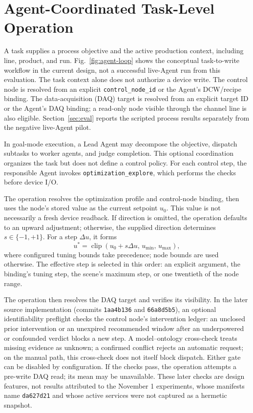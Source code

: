 \section{Agent-Coordinated Task-Level Operation}
\label{sec:closed-loop-operation}

A task supplies a process objective and the active production context, including line, product, and run. Fig.~\ref{fig:agent-loop} shows the conceptual task-to-write workflow in the current design, not a successful live-Agent run from this evaluation. The task context alone does not authorize a device write. The control node is resolved from an explicit \texttt{control\_node\_id} or the Agent's DCW/recipe binding. The data-acquisition (DAQ) target is resolved from an explicit target ID or the Agent's DAQ binding; a read-only node visible through the channel line is also eligible. Section~\ref{sec:eval} reports the scripted process results separately from the negative live-Agent pilot.

In goal-mode execution, a Lead Agent may decompose the objective, dispatch subtasks to worker agents, and judge completion. This optional coordination organizes the task but does not define a control policy. For each control step, the responsible Agent invokes \texttt{optimization\_explore}, which performs the checks before device I/O.

The operation resolves the optimization profile and control-node binding, then uses the node's stored value as the current setpoint $u_0$. This value is not necessarily a fresh device readback. If direction is omitted, the operation defaults to an upward adjustment; otherwise, the supplied direction determines $s\in\{-1,+1\}$. For a step $\Delta u$, it forms
\begin{equation}
 u^{*}=\operatorname{clip}\!\left(u_0+s\Delta u,\,u_{\min},\,u_{\max}\right),
 \label{eq:optimization-candidate}
\end{equation}
where configured tuning bounds take precedence; node bounds are used otherwise. The effective step is selected in this order: an explicit argument, the binding's tuning step, the scene's maximum step, or one twentieth of the node range.

The operation then resolves the DAQ target and verifies its visibility. In the later source implementation (commits \texttt{1aa4b136} and \texttt{66a8d5b5}), an optional identifiability preflight checks the control node's intervention ledger: an unclosed prior intervention or an unexpired recommended window after an underpowered or confounded verdict blocks a new step. A model--ontology cross-check treats missing evidence as unknown; a confirmed conflict rejects an automatic request; on the manual path, this cross-check does not itself block dispatch. Either gate can be disabled by configuration. If the checks pass, the operation attempts a pre-write DAQ read; its mean may be unavailable. These later checks are design features, not results attributed to the November 1 experiments, whose manifests name \texttt{da627d21} and whose active services were not captured as a hermetic snapshot.

